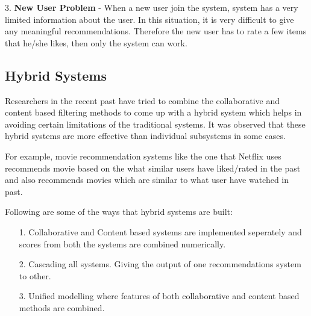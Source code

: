 3. {\bf New User Problem} - When a new user join the system, system has a very limited information about the user. In this situation, it is very difficult to give any meaningful recommendations. Therefore the new user has to rate a few items that he/she likes, then only the system can work. 

\subsection{Hybrid Systems}
Researchers in the recent past have tried to combine the collaborative and content based filtering methods to come up with a hybrid system which helps in avoiding certain limitations of the traditional systems. It was observed that these hybrid systems are more effective than individual subsystems in some cases.

For example, movie recommendation systems like the one that Netflix uses recommends movie based on the what similar users have liked/rated in the past and also recommends movies which are similar to what user have watched in past.

Following are some of the ways that hybrid systems are built:
\begin{itemize}
\item[1.]Collaborative and Content based systems are implemented seperately and scores from both the systems are combined numerically.
\item[2.]Cascading all systems. Giving the output of one recommendations system to other.
\item[3.]Unified modelling where features of both collaborative and content based methods are combined. 
\end{itemize}
\newpage